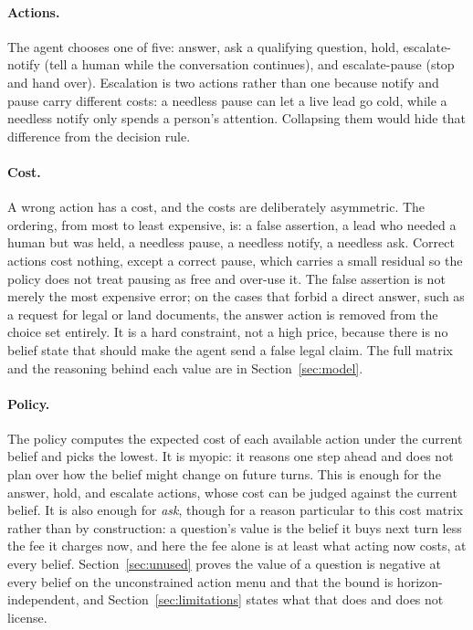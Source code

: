 \documentclass{article}
\begin{document}
\paragraph{Actions.} The agent chooses one of five: answer, ask a qualifying
question, hold, escalate-notify (tell a human while the conversation continues),
and escalate-pause (stop and hand over). Escalation is two actions rather than
one because notify and pause carry different costs: a needless pause can let a
live lead go cold, while a needless notify only spends a person's attention.
Collapsing them would hide that difference from the decision rule.

\paragraph{Cost.} A wrong action has a cost, and the costs are deliberately
asymmetric. The ordering, from most to least expensive, is: a false assertion, a
lead who needed a human but was held, a needless pause, a needless notify, a
needless ask. Correct actions cost nothing, except a correct pause, which carries
a small residual so the policy does not treat pausing as free and over-use it.
The false assertion is not merely the most expensive error; on the cases that
forbid a direct answer, such as a request for legal or land documents, the answer
action is removed from the choice set entirely. It is a hard constraint, not a
high price, because there is no belief state that should make the agent send a
false legal claim. The full matrix and the reasoning behind each value are in
Section~\ref{sec:model}.

\paragraph{Policy.} The policy computes the expected cost of each available
action under the current belief and picks the lowest. It is myopic: it reasons
one step ahead and does not plan over how the belief might change on future turns.
This is enough for the answer, hold, and escalate actions, whose cost can be
judged against the current belief. It is also enough for \emph{ask}, though for a
reason particular to this cost matrix rather than by construction: a question's
value is the belief it buys next turn less the fee it charges now, and here the
fee alone is at least what acting now costs, at every belief.
Section~\ref{sec:unused} proves the value of a question is negative at every
belief on the unconstrained action menu and that the bound is horizon-independent,
and Section~\ref{sec:limitations} states what that does and does not license.
\end{document}

